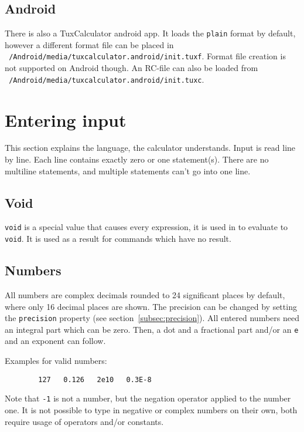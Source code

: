 \documentclass[10pt]{article}
\let\~=\allowbreak
\begin{document}
    \subsection{Android}
    There is also a TuxCalculator android app.
    It loads the \verb|plain| format by default, however a different format file can be placed in \texttt{\string~/Android\~/media\~/tuxcalculator.android\~/init.tuxf}.
    Format file creation is not supported on Android though.
    An RC-file can also be loaded from \texttt{\string~/Android\~/media\~/tuxcalculator.android\~/init.tuxc}.
    
    \section{Entering input}\label{sec:entering-input}
    This section explains the language, the calculator understands.
    Input is read line by line.
    Each line contains exactly zero or one statement{\small(s)}.
    There are no multiline statements, and multiple statements can't go into one line.
    
    \subsection{Void}\label{subsec:void}
    \verb|void| is a special value that causes every expression, it is used in to evaluate to \verb|void|.
    It is used as a result for commands which have no result.
    
    \subsection{Numbers}\label{subsec:numbers}
    All numbers are complex decimals rounded to 24 significant places by default, where only 16 decimal places are shown.
    The precision can be changed by setting the \verb|precision| property (see section~\ref{subsec:precision}).
    All entered numbers need an integral part which can be zero.
    Then, a dot and a fractional part and/or an \verb|e| and an exponent can follow.
    
    Examples for valid numbers:
    \begin{verbatim}
        127   0.126   2e10   0.3E-8
    \end{verbatim}
    Note that \verb|-1| is not a number, but the negation operator applied to the number one.
    It is not possible to type in negative or complex numbers on their own, both require usage of operators and/or constants.
    
\end{document}
